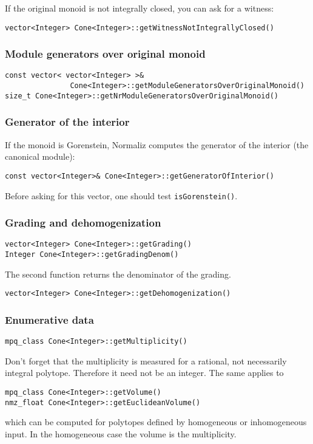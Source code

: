 \documentclass[12pt,a4paper]{scrartcl}
\theoremstyle{definition}
\begin{document}
\begin{small}
If the original monoid is not integrally closed, you can ask for a witness:
\begin{Verbatim}
vector<Integer> Cone<Integer>::getWitnessNotIntegrallyClosed()
\end{Verbatim}

\subsubsection{Module generators over original monoid}

\begin{Verbatim}
const vector< vector<Integer> >& 
               Cone<Integer>::getModuleGeneratorsOverOriginalMonoid()
size_t Cone<Integer>::getNrModuleGeneratorsOverOriginalMonoid()
\end{Verbatim}

\subsubsection{Generator of the interior}\label{GenInt}

If the monoid is Gorenstein, Normaliz computes the generator of the interior (the canonical module):
\begin{Verbatim}
const vector<Integer>& Cone<Integer>::getGeneratorOfInterior()
\end{Verbatim}
Before asking for this vector, one should test \verb|isGorenstein()|.

\subsubsection{Grading and dehomogenization}

\begin{Verbatim}
vector<Integer> Cone<Integer>::getGrading()
Integer Cone<Integer>::getGradingDenom()
\end{Verbatim}
The second function returns the denominator of the grading.

\begin{Verbatim}
vector<Integer> Cone<Integer>::getDehomogenization()
\end{Verbatim}

\subsubsection{Enumerative data}

\begin{Verbatim}
mpq_class Cone<Integer>::getMultiplicity()
\end{Verbatim}
Don't forget that the multiplicity is measured for a rational, not necessarily integral polytope. Therefore it need not be an integer. The same applies to
\begin{Verbatim}
mpq_class Cone<Integer>::getVolume()
nmz_float Cone<Integer>::getEuclideanVolume()
\end{Verbatim}
which can be computed for polytopes defined by homogeneous or inhomogeneous input. In the homogeneous case the volume is the multiplicity.


\end{small}
\end{document}
